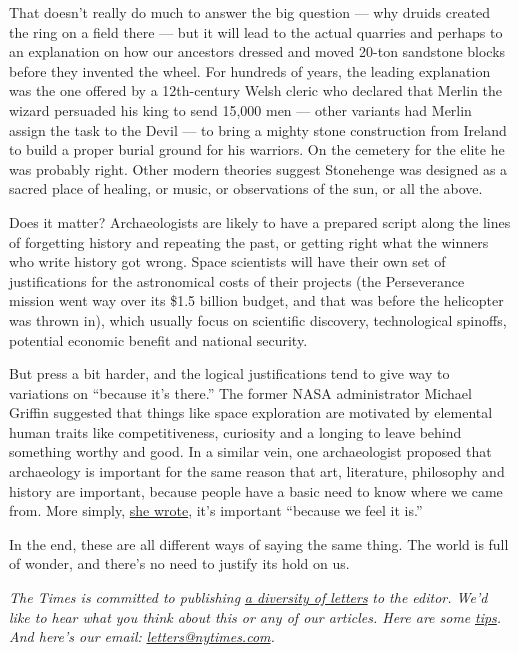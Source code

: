 That doesn't really do much to answer the big question --- why druids
created the ring on a field there --- but it will lead to the actual
quarries and perhaps to an explanation on how our ancestors dressed and
moved 20-ton sandstone blocks before they invented the wheel. For
hundreds of years, the leading explanation was the one offered by a
12th-century Welsh cleric who declared that Merlin the wizard persuaded
his king to send 15,000 men --- other variants had Merlin assign the
task to the Devil --- to bring a mighty stone construction from Ireland
to build a proper burial ground for his warriors. On the cemetery for
the elite he was probably right. Other modern theories suggest
Stonehenge was designed as a sacred place of healing, or music, or
observations of the sun, or all the above.

Does it matter? Archaeologists are likely to have a prepared script
along the lines of forgetting history and repeating the past, or getting
right what the winners who write history got wrong. Space scientists
will have their own set of justifications for the astronomical costs of
their projects (the Perseverance mission went way over its \$1.5 billion
budget, and that was before the helicopter was thrown in), which usually
focus on scientific discovery, technological spinoffs, potential
economic benefit and national security.

But press a bit harder, and the logical justifications tend to give way
to variations on ``because it's there.'' The former NASA administrator
Michael Griffin suggested that things like space exploration are
motivated by elemental human traits like competitiveness, curiosity and
a longing to leave behind something worthy and good. In a similar vein,
one archaeologist proposed that archaeology is important for the same
reason that art, literature, philosophy and history are important,
because people have a basic need to know where we came from. More
simply,
\href{https://pahistoricpreservation.com/why-is-archaeology-important/}{she
wrote}, it's important ``because we feel it is.''

In the end, these are all different ways of saying the same thing. The
world is full of wonder, and there's no need to justify its hold on us.

\emph{The Times is committed to publishing}
\href{https://www.nytimes.com/2019/01/31/opinion/letters/letters-to-editor-new-york-times-women.html}{\emph{a
diversity of letters}} \emph{to the editor. We'd like to hear what you
think about this or any of our articles. Here are some}
\href{https://help.nytimes.com/hc/en-us/articles/115014925288-How-to-submit-a-letter-to-the-editor}{\emph{tips}}\emph{.
And here's our email:}
\href{mailto:letters@nytimes.com}{\emph{letters@nytimes.com}}\emph{.}

